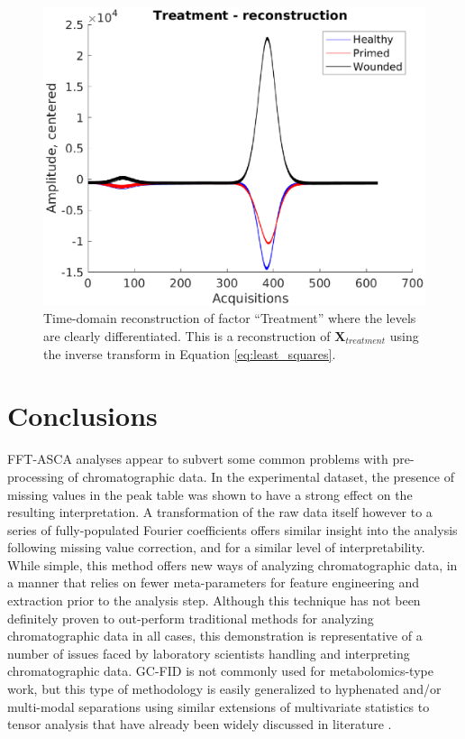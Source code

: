 \documentclass[preprint,12pt]{elsarticle}
\begin{document}
\begin{figure}[hbt!]
    \centering
    \includegraphics[width=0.9\linewidth]{time_treat.eps}
    \caption{Time-domain reconstruction of factor ``Treatment'' where the levels are clearly differentiated. This is a reconstruction of $\mathbf{X}_{treatment}$ using the inverse transform in Equation \ref{eq:least_squares}.}
    \label{fig:freq_treat}
\end{figure}


\section{Conclusions}

FFT-ASCA analyses appear to subvert some common problems with pre-processing of chromatographic data. In the experimental dataset, the presence of missing values in the peak table was shown to have a strong effect on the resulting interpretation. A transformation of the raw data itself however to a series of fully-populated Fourier coefficients offers similar insight into the analysis following missing value correction, and for a similar level of interpretability. While simple, this method offers new ways of analyzing chromatographic data, in a manner that relies on fewer meta-parameters for feature engineering and extraction prior to the analysis step. Although this technique has not been definitely proven to out-perform traditional methods for analyzing chromatographic data in all cases, this demonstration is representative of a number of issues faced by laboratory scientists handling and interpreting chromatographic data. GC-FID is not commonly used for metabolomics-type work, but this type of methodology is easily generalized to hyphenated and/or multi-modal separations using similar extensions of multivariate statistics to tensor analysis that have already been widely discussed in literature \cite{koleini2023complementary}. 
\end{document}
